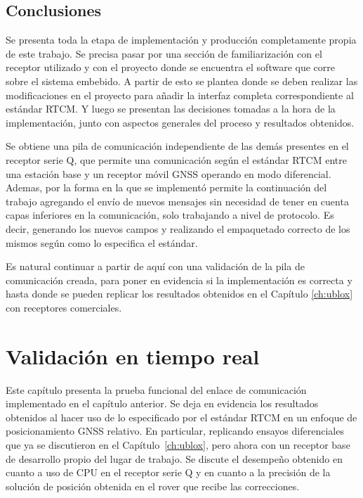 \documentclass[a4paper,12pt,oneside,onecolumn,final,openright]{book}%
\begin{document}
\section{Conclusiones}
	Se presenta toda la etapa de implementación y producción completamente propia de este trabajo. Se precisa pasar por una sección de familiarización con el receptor utilizado y con el proyecto donde se encuentra el software que corre sobre el sistema embebido. A partir de esto se plantea donde se deben realizar las modificaciones en el proyecto para añadir la interfaz completa correspondiente al estándar RTCM. Y luego se presentan las decisiones tomadas a la hora de la implementación, junto con aspectos generales del proceso y resultados obtenidos. 
	
	Se obtiene una pila de comunicación independiente de las demás presentes en el receptor serie Q, que permite una comunicación según el estándar RTCM entre una estación base y un receptor móvil GNSS operando en modo diferencial. Ademas, por la forma en la que se implementó permite la continuación del trabajo agregando el envío de nuevos mensajes sin necesidad de tener en cuenta capas inferiores en la comunicación, solo trabajando a nivel de protocolo. Es decir, generando los nuevos campos y realizando el empaquetado correcto de los mismos según como lo especifica el estándar.
	
	Es natural continuar a partir de aquí con una validación de la pila de comunicación creada, para poner en evidencia si la implementación es correcta y hasta donde se pueden replicar los resultados obtenidos en el Capítulo \ref{ch:ublox} con receptores comerciales.
\chapter{Validación en tiempo real}\label{ch:validacion}
	Este capítulo presenta la prueba funcional del enlace de comunicación implementado en el capítulo anterior. Se deja en evidencia los resultados obtenidos al hacer uso de lo especificado por el estándar RTCM en un enfoque de posicionamiento GNSS relativo. En particular, replicando ensayos diferenciales que ya se discutieron en el Capítulo~\ref{ch:ublox}, pero ahora con un receptor base de desarrollo propio del lugar de trabajo. Se discute el desempeño obtenido en cuanto a uso de CPU en el receptor serie Q y en cuanto a la precisión de la solución de posición obtenida en el rover que recibe las correcciones.
\end{document}
